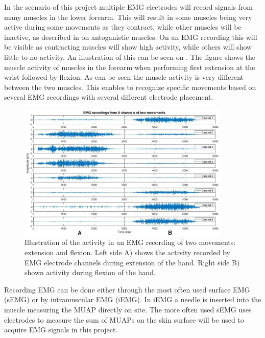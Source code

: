 In the scenario of this project multiple EMG electrodes will record signals from many muscles in the lower forearm. This will result in some muscles being very active during some movements as they contract, while other muscles will be inactive, as described in  on antoganistic muscles. On an EMG recording this will be visible as contracting muscles will show high activity, while others will show little to no activity. An illustration of this can be seen on . The figure shows the muscle activity of muscles in the forearm when performing first extension at the wrist followed by flexion. As can be seen the muscle activity is very different between the two muscles. This enables to recognize specific movements based on several EMG recordings with several different electrode placement. 

\begin{figure}[H] 
	\includegraphics[width=0.9\textwidth]{figures/xBackground/EMGactivityExtensionFlexion}
	\caption{Illustration of the activity in an EMG recording of two movements: extension and flexion. Left side A) shows the activity recorded by EMG electrode channels during extension of the hand. Right side B) shown activity during flexion of the hand.}
	\label{fig:EMGactivityExtensionFlexion}
\end{figure}


Recording EMG can be done either through the most often used surface EMG (sEMG) or by intramuscular EMG (iEMG). In iEMG a needle is inserted into the muscle measuring the MUAP directly on site. The more often used sEMG uses electrodes to measure the sum of MUAPs on the skin surface will be used to acquire EMG signals in this project. \cite{Cram2012}
